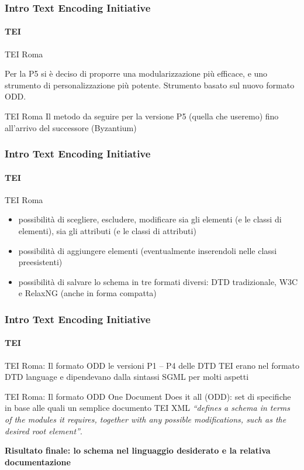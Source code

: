\begin{frame}
	\frametitle{Intro Text Encoding Initiative}
	\framesubtitle{TEI}
	\addtocounter{nframe}{1}

	\begin{block}{TEI Roma}

		Per la P5 si è deciso di proporre una modularizzazione più
		efficace, e uno strumento di personalizzazione più potente.
		Strumento basato sul nuovo formato ODD.


	\end{block}

	\begin{block}{TEI Roma}
		Il metodo da seguire per la versione P5 (quella che
		useremo) fino all’arrivo del successore (Byzantium)

	\end{block}

\end{frame}

\begin{frame}
	\frametitle{Intro Text Encoding Initiative}
	\framesubtitle{TEI}
	\addtocounter{nframe}{1}

	\begin{block}{TEI Roma}

		\begin{itemize}
			\item  possibilità di scegliere, escludere, modificare sia gli elementi (e le classi di elementi), sia gli attributi (e le classi di attributi)
			\item possibilità di aggiungere elementi (eventualmente inserendoli nelle classi preesistenti)
			\item possibilità di salvare lo schema in tre formati diversi: DTD  tradizionale, W3C e RelaxNG (anche in forma compatta)
		\end{itemize}

	\end{block}


\end{frame}


\begin{frame}
	\frametitle{Intro Text Encoding Initiative}
	\framesubtitle{TEI}
	\addtocounter{nframe}{1}

	\begin{block}{TEI Roma: Il formato ODD}
		le versioni P1 – P4 delle DTD TEI erano nel formato DTD language e dipendevano dalla sintassi SGML per molti aspetti
	\end{block}

	\begin{block}{TEI Roma: Il formato ODD}
		One Document Does it all (ODD): set di specifiche in base alle quali un semplice documento TEI XML \textit{“defines a schema in terms of the modules it requires, together with any possible modifications, such as the desired
        root element”}. 
    \end{block}
    
    \textbf{Risultato finale: lo schema nel linguaggio desiderato e la relativa documentazione}

\end{frame}


